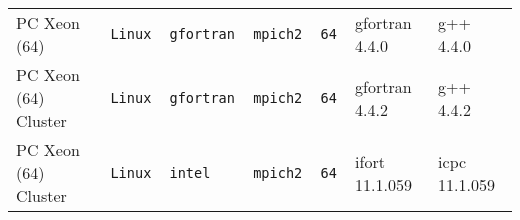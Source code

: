 \begin{tabular}{lllllll}
PC Xeon (64)          &\tt Linux  &\tt gfortran     &\tt mpich2     &\tt 64              & gfortran \footnotesize 4.4.0       & g++  \footnotesize 4.4.0        \\ %
PC Xeon (64) Cluster  &\tt Linux  &\tt gfortran     &\tt mpich2     &\tt 64              & gfortran \footnotesize 4.4.2       & g++  \footnotesize 4.4.2        \\ %
PC Xeon (64) Cluster  &\tt Linux  &\tt intel        &\tt mpich2     &\tt 64              & ifort \footnotesize 11.1.059       & icpc \footnotesize 11.1.059     \\ %

\end{tabular}
